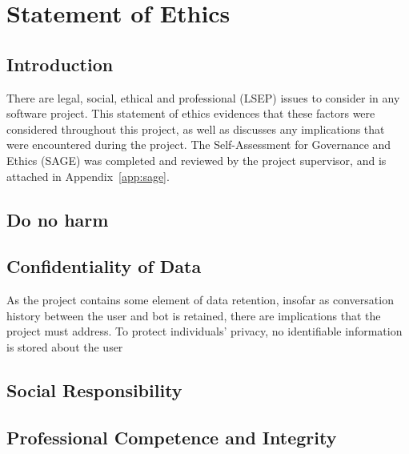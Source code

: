 \chapter{Statement of Ethics}
\label{ch:ethics}

\section{Introduction}
There are legal, social, ethical and professional (LSEP) issues to consider in any software project. This statement of ethics evidences that these factors were  considered throughout this project, as well as discusses any implications that were encountered during the project. The Self-Assessment for Governance and Ethics (SAGE) was completed and reviewed by the project supervisor, and is attached in Appendix~\ref{app:sage}.

\section{Do no harm}

\section{Confidentiality of Data}
As the project contains some element of data retention, insofar as conversation history between the user and bot is retained, there are implications that the project must address. To protect individuals' privacy, no identifiable information is stored about the user

\section{Social Responsibility}

\section{Professional Competence and Integrity}